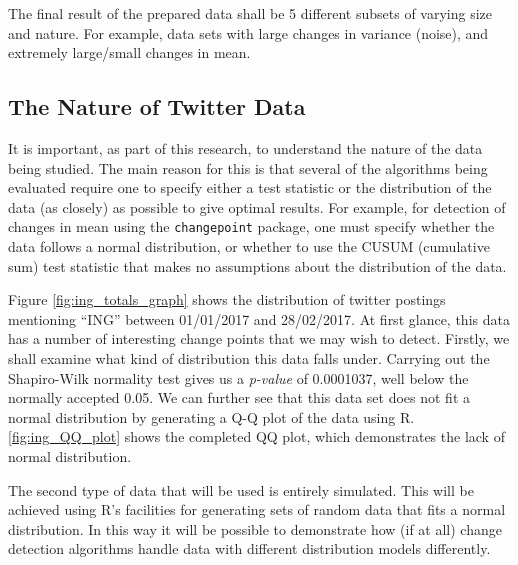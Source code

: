 \documentclass{uvamscse}	%
\begin{document}

The final result of the prepared data shall be 5 different subsets of varying size and nature. For example, data sets with large changes in variance (noise), and extremely large/small changes in mean.

\subsection{The Nature of Twitter Data}

It is important, as part of this research, to understand the nature of the data being studied. The main reason for this is that several of the algorithms being evaluated require one to specify either a test statistic or the distribution of the data (as closely) as possible to give optimal results. For example, for detection of changes in mean using the \texttt{changepoint} package, one must specify whether the data follows a normal distribution, or whether to use the CUSUM (cumulative sum) test statistic that makes no assumptions about the distribution of the data.


Figure \ref{fig:ing_totals_graph} shows the distribution of twitter postings mentioning ``ING'' between 01/01/2017 and 28/02/2017. At first glance, this data has a number of interesting change points that we may wish to detect. Firstly, we shall examine what kind of distribution this data falls under. Carrying out the Shapiro-Wilk normality test gives us a \emph{p-value} of 0.0001037, well below the normally accepted 0.05. We can further see that this data set does not fit a normal distribution by generating a Q-Q plot of the data using R. \ref{fig:ing_QQ_plot} shows the completed QQ plot, which demonstrates the lack of normal distribution.


The second type of data that will be used is entirely simulated. This will be achieved using R's facilities for generating sets of random data that fits a normal distribution. In this way it will be possible to demonstrate how (if at all) change detection algorithms handle data with different distribution models differently.
\end{document}
